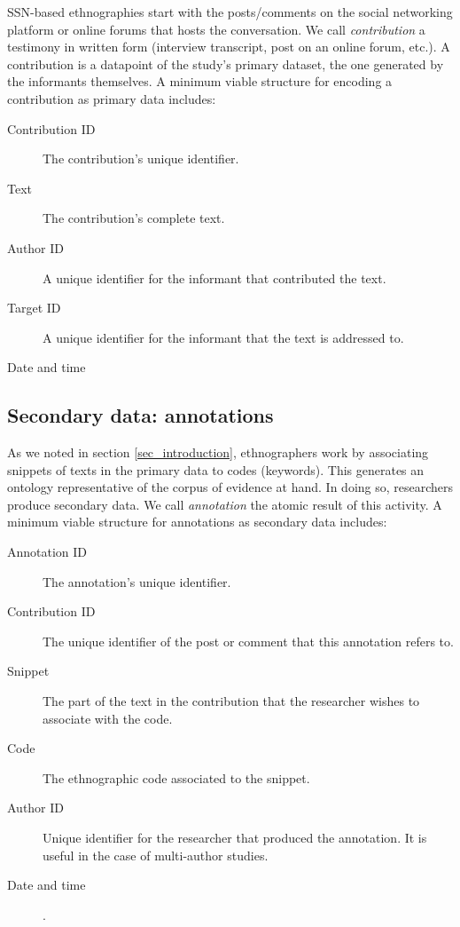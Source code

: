 \documentclass{llncs}
\begin{document}
SSN-based ethnographies start with the posts/comments on the social networking platform or online forums that hosts the conversation. We call \emph{contribution} a testimony in written form (interview transcript, post on an online forum, etc.). A contribution is a datapoint of the study's primary dataset, the one generated by the informants themselves. A minimum viable structure for encoding a contribution as primary data includes:
\begin{description}
\item[Contribution ID] The contribution's unique identifier.
\item[Text] The contribution's complete text.
\item[Author ID] A unique identifier for the informant that contributed the text. 
\item[Target ID] A unique identifier for the informant that the text is addressed to.
\item[Date and time] 
\end{description}

\subsection{Secondary data: annotations} \label{ssec_secondary_data}
As we noted in section \ref{sec_introduction}, ethnographers work by associating snippets of texts in the primary data to codes (keywords). This generates an ontology representative of the corpus of evidence at hand. In doing so, researchers produce secondary data. We call \emph{annotation} the atomic result of this activity. A minimum viable structure for annotations as secondary data includes:
\begin{description}
\item[Annotation ID] The annotation's unique identifier.
\item[Contribution ID] The unique identifier of the post or comment that this annotation refers to.
\item[Snippet] The part of the text in the contribution that the researcher wishes to associate with the code.
\item[Code] The ethnographic code associated to the snippet.
\item[Author ID] Unique identifier for the researcher that produced the annotation. It is useful in the case of multi-author studies.
\item[Date and time].
\end{description}
\end{document}
